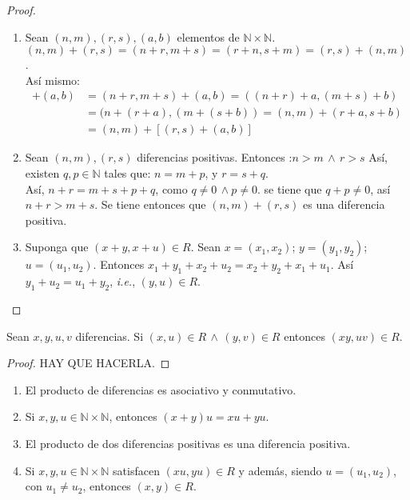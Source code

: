 \begin{proof}
  \begin{enumerate}
    \item Sean $ (n,m),(r,s),(a,b)$ elementos de $\mathbb{N} \times
      \mathbb{N}$.\\
      $(n,m)+(r,s) = (n+r,m+s)=(r+n,s+m)=(r,s)+(n,m)$.\\
      Así mismo: \\
      \begin{align*}
        [(n,m) + (r + s)] + (a,b) &= (n + r, m + s) + ( a, b) = ((n + r)
        + a, (m + s) + b) \\
        &= (n + (r + a), (m + (s + b)) = (n,m) + (r+a, s+b) \\
        &=(n,m) + [(r,s) + (a,b)] 
      \end{align*}
    \item  Sean $(n,m), (r,s)$ diferencias positivas. Entonces :$n > m \,
      \land \, r>s $ Así, existen $q,p \in \mathbb{N}$ tales que: $n = m
      +p$, y $ r =s+ q$.\\
      Así, $ n +r = m + s + p + q$, como $q \neq 0 \, \land p \neq 0$. se
      tiene que $q + p \neq 0$, así $n + r > m + s$. Se tiene entonces 
      que $(n,m) + (r, s)$ es una diferencia positiva.
    \item Suponga que $ (x +y, x +u) \in R$. Sean $x = (x_1, x_2)$; $y =
      (y_1,y_2)$; $u = (u_1, u_2)$. Entonces $x_1 + y_1 + x_2 + u_2 = x_2
      + y_2 + x_1 + u_1$. Así $y_1 + u_2 = u_1 + y_2$, \textit{i.e.},
      $(y,u)\in R$.
  \end{enumerate}
\end{proof}
\begin{lemma}\label{lemma:6}
  Sean $x,y,u,v$ diferencias. Si $(x,u)\in R \, \land \, (y,v) \in R$ entonces
  $(xy, uv) \in R$.
\end{lemma}
\begin{proof}
  HAY QUE HACERLA.
\end{proof}
\begin{lemma}\label{lemma:7}
  \begin{enumerate}
    \item El producto de diferencias es asociativo y conmutativo.
    \item Si $x,y,u \in \mathbb{N} \times \mathbb{N}$, entonces $(x + y)u =
      xu + yu$.
    \item El producto de dos diferencias positivas es una diferencia
      positiva.
    \item Si $x, y , u \in \mathbb{N} \times \mathbb{N}$ satisfacen $(xu,
      yu) \in R$ y además, siendo $u = (u_1, u_2)$, con $u_1 \neq
      u_2$, entonces $(x,y) \in R$.
  \end{enumerate}
\end{lemma}
